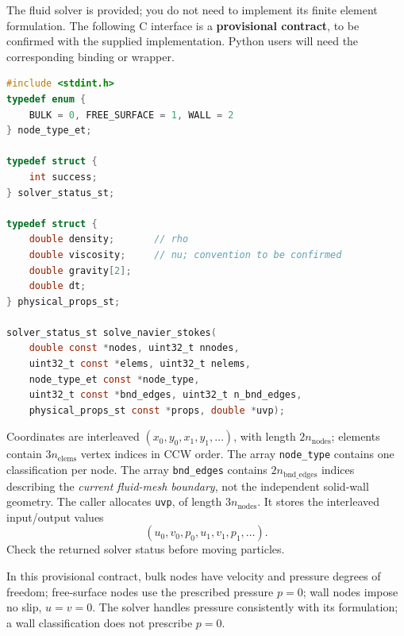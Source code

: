 \documentclass[11pt,a4paper]{article}
\begin{document}
The fluid solver is provided; you do not need to implement its finite
element formulation. The following C interface is a \textbf{provisional
contract}, to be confirmed with the supplied implementation. Python users
will need the corresponding binding or wrapper.

\begin{lstlisting}[style=code,language=C,caption={Provisional solver interface},captionpos=b]
#include <stdint.h>
typedef enum {
    BULK = 0, FREE_SURFACE = 1, WALL = 2
} node_type_et;

typedef struct {
    int success;
} solver_status_st;

typedef struct {
    double density;       // rho
    double viscosity;     // nu; convention to be confirmed
    double gravity[2];
    double dt;
} physical_props_st;

solver_status_st solve_navier_stokes(
    double const *nodes, uint32_t nnodes,
    uint32_t const *elems, uint32_t nelems,
    node_type_et const *node_type,
    uint32_t const *bnd_edges, uint32_t n_bnd_edges,
    physical_props_st const *props, double *uvp);
\end{lstlisting}

Coordinates are interleaved $(x_0,y_0,x_1,y_1,\ldots)$, with length
$2n_{\mathrm{nodes}}$; elements contain $3n_{\mathrm{elems}}$ vertex indices
in CCW order. The array \texttt{node\_type} contains one classification per
node. The array \texttt{bnd\_edges} contains $2n_{\mathrm{bnd\_edges}}$
indices describing the \emph{current fluid-mesh boundary}, not the independent
solid-wall geometry. The caller allocates \texttt{uvp}, of length
$3n_{\mathrm{nodes}}$. It stores the interleaved input/output values
\[
  (u_0,v_0,p_0,u_1,v_1,p_1,\ldots).
\] Check the returned solver status before moving particles.

In this provisional contract, bulk nodes have velocity and pressure degrees
of freedom; free-surface nodes use the prescribed pressure $p=0$; wall
nodes impose no slip, $u=v=0$. The solver handles pressure consistently
with its formulation; a wall classification does not prescribe $p=0$.
\end{document}
